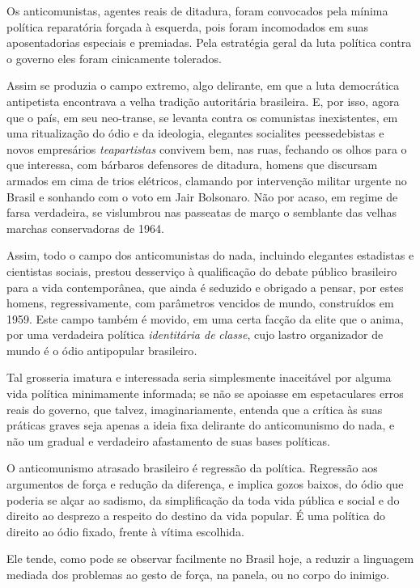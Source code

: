 Os anticomunistas, agentes reais de ditadura, foram convocados pela
mínima política reparatória forçada à esquerda, pois foram incomodados
em suas aposentadorias especiais e premiadas. Pela estratégia geral da
luta política contra o governo eles foram cinicamente tolerados.

Assim se produzia o campo extremo, algo delirante, em que a luta
democrática antipetista encontrava a velha tradição autoritária
brasileira. E, por isso, agora que o país, em seu neo-transe, se levanta
contra os comunistas inexistentes, em uma ritualização do ódio e da
ideologia, elegantes socialites peessedebistas e novos empresários
\emph{teapartistas} convivem bem, nas ruas, fechando os olhos para o que
interessa, com bárbaros defensores de ditadura, homens que discursam
armados em cima de trios elétricos, clamando por intervenção militar
urgente no Brasil e sonhando com o voto em Jair Bolsonaro. Não por
acaso, em regime de farsa verdadeira, se vislumbrou nas passeatas de
março o semblante das velhas marchas conservadoras de 1964.

Assim, todo o campo dos anticomunistas do nada, incluindo elegantes
estadistas e cientistas sociais, prestou desserviço à qualificação do
debate público brasileiro para a vida contemporânea, que ainda é
seduzido e obrigado a pensar, por estes homens, regressivamente, com
parâmetros vencidos de mundo, construídos em 1959. Este campo também é
movido, em uma certa facção da elite que o anima, por uma verdadeira
política \emph{identitária de} \emph{classe}, cujo lastro organizador de
mundo é o ódio antipopular brasileiro\emph{. }

Tal grosseria imatura e interessada seria simplesmente inaceitável por
alguma vida política minimamente informada; se não se apoiasse em
espetaculares erros reais do governo, que talvez, imaginariamente,
entenda que a crítica às suas práticas graves seja apenas a ideia fixa
delirante do anticomunismo do nada, e não um gradual e verdadeiro
afastamento de suas bases políticas.

O anticomunismo atrasado brasileiro é regressão da política. Regressão
aos argumentos de força e redução da diferença, e implica gozos baixos,
do ódio que poderia se alçar ao sadismo, da simplificação da toda vida
pública e social e do direito ao desprezo a respeito do destino da vida
popular. É uma política do direito ao ódio fixado, frente à vítima
escolhida.

Ele tende, como pode se observar facilmente no Brasil hoje, a reduzir a
linguagem mediada dos problemas ao gesto de força, na panela, ou no
corpo do inimigo.

